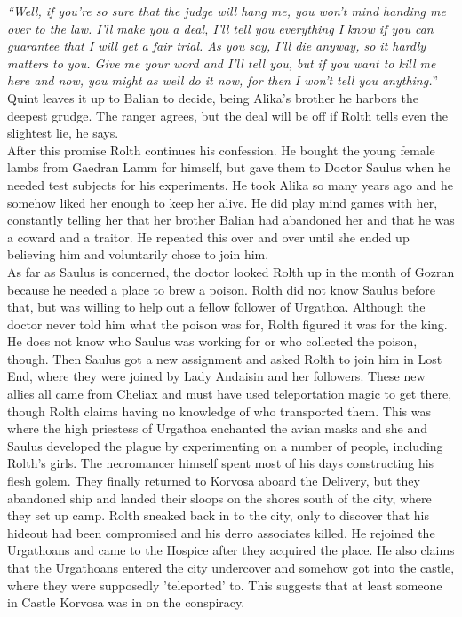 {\itshape``Well, if you're so sure that the judge will hang me, you won't mind handing me over to the law. I'll make you a deal, I'll tell you everything I know if you can guarantee that I will get a fair trial. As you say, I'll die anyway, so it hardly matters to you. Give me your word and I'll tell you, but if you want to kill me here and now, you might as well do it now, for then I won't tell you anything.}'' Quint leaves it up to Balian to decide, being Alika's brother he harbors the deepest grudge. The ranger agrees, but the deal will be off if Rolth tells even the slightest lie, he says.\\

After this promise Rolth continues his confession. He bought the young female lambs from Gaedran Lamm for himself, but gave them to Doctor Saulus when he needed test subjects for his experiments. He took Alika so many years ago and he somehow liked her enough to keep her alive. He did play mind games with her, constantly telling her that her brother Balian had abandoned her and that he was a coward and a traitor. He repeated this over and over until she ended up believing him and voluntarily chose to join him.\\

As far as Saulus is concerned, the doctor looked Rolth up in the month of Gozran because he needed a place to brew a poison. Rolth did not know Saulus before that, but was willing to help out a fellow follower of Urgathoa. Although the doctor never told him what the poison was for, Rolth figured it was for the king. He does not know who Saulus was working for or who collected the poison, though. Then Saulus got a new assignment and asked Rolth to join him in Lost End, where they were joined by Lady Andaisin and her followers. These new allies all came from Cheliax and must have used teleportation magic to get there, though Rolth claims having no knowledge of who transported them. This was where the high priestess of Urgathoa enchanted the avian masks and she and Saulus developed the plague by experimenting on a number of people, including Rolth's girls. The necromancer himself spent most of his days constructing his flesh golem. They finally returned to Korvosa aboard the Delivery, but they abandoned ship and landed their sloops on the shores south of the city, where they set up camp. Rolth sneaked back in to the city, only to discover that his hideout had been compromised and his derro associates killed. He rejoined the Urgathoans and came to the Hospice after they acquired the place. He also claims that the Urgathoans entered the city undercover and somehow got into the castle, where they were supposedly 'teleported' to. This suggests that at least someone in Castle Korvosa was in on the conspiracy.\\

